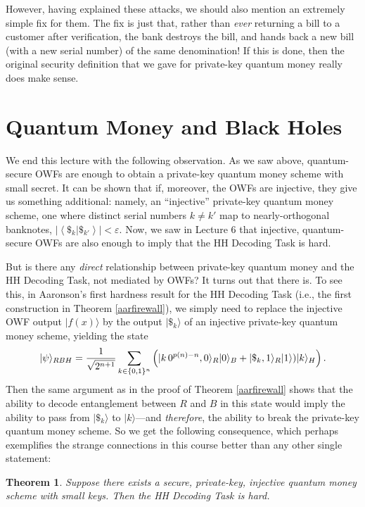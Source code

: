 \documentclass[12pt]{report}
\theoremstyle{plain}
\newtheorem{theorem}{Theorem}[section]
\theoremstyle{definition}
\newcommand{\eps}{\varepsilon}
\renewcommand{\ket}[1]{|#1\rangle}
\begin{document}
However, having explained these attacks, we should also mention an extremely simple fix for them.  The fix is just that, rather than {\em ever} returning a bill to a customer after verification, the bank destroys the bill, and hands back a new bill (with a new serial number) of the same denomination!  If this is done, then the original security definition that we gave for private-key quantum money really does make sense.

\section{Quantum Money and Black Holes}

We end this lecture with the following observation.  As we saw above, quantum-secure OWFs are enough to obtain a private-key quantum money scheme with small secret.  It can be shown that if, moreover, the OWFs are injective, they give us something additional: namely, an ``injective'' private-key quantum money scheme, one where distinct serial numbers $k\ne k'$ map to nearly-orthogonal banknotes, $\left| \left\langle \$_k | \$_{k'} \right\rangle \right| < \eps$.  Now, we saw in Lecture 6 that injective, quantum-secure OWFs are also enough to imply that the HH Decoding Task is hard.

But is there any {\em direct} relationship between private-key quantum money and the HH Decoding Task, not mediated by OWFs?  It turns out that there is.  To see this, in Aaronson's first hardness result for the HH Decoding Task (i.e., the first construction in Theorem \ref{aarfirewall}), we simply need to replace the injective OWF output $\ket{f(x)}$ by the output $\ket{\$_k}$ of an injective private-key quantum money scheme, yielding the state
$$
\ket{\psi}_{RBH} = {1 \over \sqrt{2^{n+1}}} \sum_{k\in\{0,1\}^n}  \left( \ket{k \, 0^{p(n)-n},0}_R \ket{0}_B + \ket{\$_k,1}_R \ket{1} ) \ket{k}_H \right).
$$
Then the same argument as in the proof of Theorem \ref{aarfirewall} shows that the ability to decode entanglement between $R$ and $B$ in this state would imply the ability to pass from $\ket{\$_k}$ to $\ket{k}$---and {\em therefore}, the ability to break the private-key quantum money scheme.  So we get the following consequence, which perhaps exemplifies the strange connections in this course better than any other single statement:

\begin{theorem}
\label{whoa}
Suppose there exists a secure, private-key, injective quantum money scheme with small keys.  Then the HH Decoding Task is hard.
\end{theorem}
\end{document}
